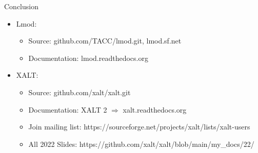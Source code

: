 \documentclass{beamer}
\begin{document}
\begin{frame}{Conclusion}
  \begin{itemize}
    \item Lmod:
      \begin{itemize}
        \item Source: github.com/TACC/lmod.git, lmod.sf.net
        \item Documentation: lmod.readthedocs.org
      \end{itemize}
    \item XALT:
      \begin{itemize}
        \item Source: github.com/xalt/xalt.git
        \item Documentation: XALT 2 $\Rightarrow$ xalt.readthedocs.org
        \item Join mailing list: https://sourceforge.net/projects/xalt/lists/xalt-users
        \item All 2022 Slides: https://github.com/xalt/xalt/blob/main/my\_docs/22/
      \end{itemize}
  \end{itemize}
\end{frame}

%
\end{document}
